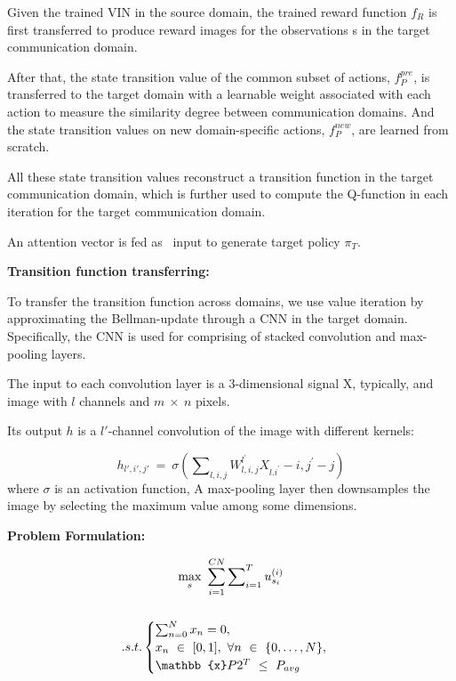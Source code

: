 \documentclass[letterpaper%
, twoside%
, 12pt%
,thesepararticles%
, english%
,creativecommons,hyperref, withAlgo2e%
]{thETS}
\begin{document}
Given the trained VIN in the source domain, the trained reward function $\displaystyle f_{R}$ is first transferred to produce reward images for the observations s in the target communication domain.

After that, the state transition value of the common subset of actions, $\displaystyle f_{P}^{pre}$, is transferred to the target domain with a learnable weight associated with each action to measure the similarity degree between communication domains. And the state transition values on new domain-specific actions, $\displaystyle f_{P}^{new}$, are learned from scratch.

All these state transition values reconstruct a transition function in the target communication domain, which is further used to compute the Q-function in each iteration for the target communication domain.

An attention vector is fed as \ input to generate target policy $\displaystyle \pi _{T}$. 

\textbf{Transition function transferring:}

To transfer the transition function across domains, we use value iteration by approximating the Bellman-update through a CNN in the target domain. Specifically, the CNN is used for comprising of stacked convolution and max-pooling layers.


The input to each convolution layer is a 3-dimensional signal X, typically, and image with $\displaystyle l$ channels and $\displaystyle m\ \times \ n$ pixels. 

Its output $\displaystyle h$ is a $\displaystyle l'$-channel convolution of the image with different kernels:

\begin{equation*}
h_{l',i',j'} \ =\ \sigma \left(\sum\nolimits _{l,i,j} W_{l,i,j}^{l^{'}} X_{l.i^{'}} -i,j^{'} -j\right)
\end{equation*}
where $\displaystyle \sigma $ is an activation function, A max-pooling layer then downsamples the image by selecting the maximum value among some dimensions.

\textbf{Problem Formulation:}

\begin{gather}
\underset{s}{\max} \ \sum _{i=1}^{CN}\sum\nolimits _{i=1}^{T} u_{s_{i}}^{( i)}\\
 \notag\\
.s.t.\begin{cases}
\sum\nolimits _{n=0}^{N} x_{n} =0, & \\
x_{n} \ \in \ [ 0,1] ,\ \forall n\ \in \ \{0,\dotsc ,N\} , & \\
\mathbb{x} P2^{T} \ \leq \ P_{avg} & 
\end{cases} \notag
\end{gather}
\end{document}
